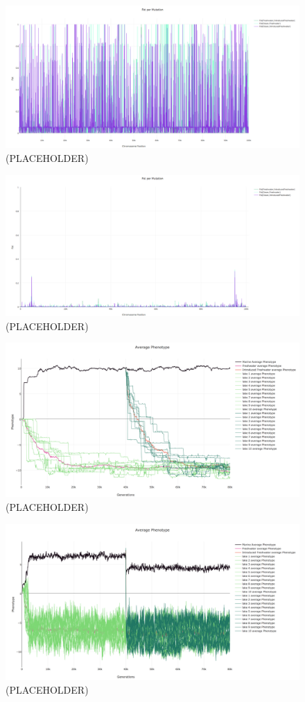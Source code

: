 \documentclass{article}
\begin{document}
\begin{figure}[h!tb]
	\begin{center}
  		\includegraphics[width=0.7\linewidth]{plotlyPlots/FstAcross5e-5.png}
  		\caption{ (PLACEHOLDER)
		}
  		\label{fig:Fst1}
	\end{center}
\end{figure}

\begin{figure}[h!tb]
	\begin{center}
  		\includegraphics[width=0.7\linewidth]{plotlyPlots/FstAcross5e-2.png}
  		\caption{(PLACEHOLDER)
		}
  		\label{fig:Fst4}
	\end{center}
\end{figure}

\begin{figure}[h!tb]
	\begin{center}
  		\includegraphics[width=0.7\linewidth]{plotlyPlots/PhenotypeThroughout5e-5.png}
  		\caption{ (PLACEHOLDER)
		}
  		\label{fig:phenotype_ts1}
	\end{center}
\end{figure}

\begin{figure}[h!tb]
	\begin{center}
  		\includegraphics[width=0.7\linewidth]{plotlyPlots/PhenotypeThroughout5e-2.png}
  		\caption{(PLACEHOLDER)
		}
  		\label{fig:phenotype_ts4}
	\end{center}
\end{figure}
\end{document}
